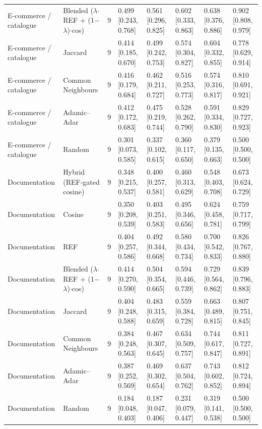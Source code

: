 \begin{table}[t]
{\begin{tabular}{llrlllll}
E-commerce / catalogue & Blended ($\lambda$$\cdot$REF + (1$-$$\lambda$)$\cdot$cos) & 9 & 0.499 [0.243, 0.768] & 0.561 [0.296, 0.825] & 0.602 [0.333, 0.863] & 0.638 [0.376, 0.886] & 0.902 [0.808, 0.979] \\
E-commerce / catalogue & Jaccard & 9 & 0.414 [0.185, 0.670] & 0.499 [0.242, 0.753] & 0.574 [0.304, 0.827] & 0.604 [0.332, 0.855] & 0.778 [0.629, 0.914] \\
E-commerce / catalogue & Common Neighbours & 9 & 0.416 [0.179, 0.684] & 0.462 [0.211, 0.727] & 0.516 [0.253, 0.773] & 0.574 [0.316, 0.817] & 0.810 [0.691, 0.921] \\
E-commerce / catalogue & Adamic--Adar & 9 & 0.412 [0.172, 0.683] & 0.475 [0.219, 0.744] & 0.528 [0.262, 0.790] & 0.591 [0.334, 0.830] & 0.829 [0.727, 0.923] \\
E-commerce / catalogue & Random & 9 & 0.301 [0.073, 0.585] & 0.337 [0.102, 0.615] & 0.360 [0.117, 0.650] & 0.379 [0.135, 0.663] & 0.500 [0.500, 0.500] \\
Documentation & Hybrid (REF-gated cosine) & 9 & 0.348 [0.215, 0.537] & 0.400 [0.257, 0.581] & 0.460 [0.313, 0.629] & 0.548 [0.403, 0.708] & 0.673 [0.624, 0.729] \\
Documentation & Cosine & 9 & 0.350 [0.208, 0.539] & 0.403 [0.251, 0.583] & 0.495 [0.346, 0.656] & 0.624 [0.458, 0.781] & 0.759 [0.717, 0.799] \\
Documentation & REF & 9 & 0.404 [0.257, 0.586] & 0.492 [0.344, 0.668] & 0.580 [0.434, 0.734] & 0.700 [0.542, 0.833] & 0.826 [0.767, 0.880] \\
Documentation & Blended ($\lambda$$\cdot$REF + (1$-$$\lambda$)$\cdot$cos) & 9 & 0.414 [0.270, 0.590] & 0.504 [0.354, 0.665] & 0.594 [0.446, 0.739] & 0.729 [0.564, 0.862] & 0.839 [0.796, 0.883] \\
Documentation & Jaccard & 9 & 0.404 [0.248, 0.588] & 0.483 [0.315, 0.659] & 0.559 [0.384, 0.728] & 0.663 [0.489, 0.815] & 0.807 [0.751, 0.845] \\
Documentation & Common Neighbours & 9 & 0.384 [0.248, 0.563] & 0.467 [0.307, 0.645] & 0.634 [0.509, 0.757] & 0.744 [0.617, 0.847] & 0.811 [0.727, 0.891] \\
Documentation & Adamic--Adar & 9 & 0.387 [0.252, 0.569] & 0.469 [0.302, 0.654] & 0.637 [0.504, 0.762] & 0.743 [0.602, 0.852] & 0.812 [0.724, 0.894] \\
Documentation & Random & 9 & 0.184 [0.048, 0.403] & 0.187 [0.047, 0.406] & 0.231 [0.079, 0.447] & 0.319 [0.141, 0.538] & 0.500 [0.500, 0.500] \\

\end{tabular}}
\end{table}
